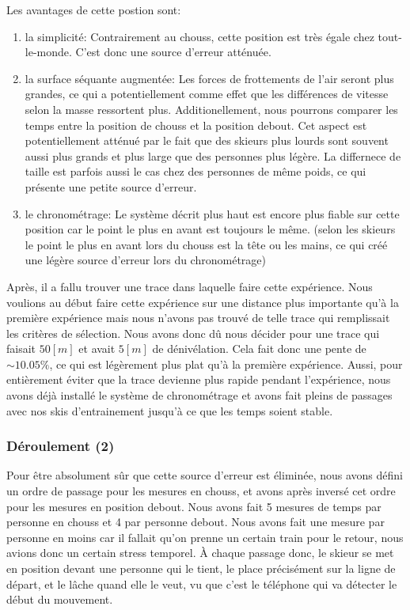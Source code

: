 \documentclass{article}
\begin{document}
Les avantages de cette postion sont:
\begin{enumerate}
    \item la simplicité: Contrairement au chouss, cette position est très égale chez tout-le-monde. C'est donc une source d'erreur atténuée.
    
    \item la surface séquante augmentée: Les forces de frottements de l'air seront plus grandes, ce qui a potentiellement comme effet que les différences de vitesse selon la masse ressortent plus. Additionellement, nous pourrons comparer les temps entre la position de chouss et la position debout. Cet aspect est potentiellement atténué par le fait que des skieurs plus lourds sont souvent aussi plus grands et plus large que des personnes plus légère. La differnece de taille est parfois aussi le cas chez des personnes de même poids, ce qui présente une petite source d'erreur.
    
    \item le chronométrage: Le système décrit plus haut est encore plus fiable sur cette position car le point le plus en avant est toujours le même. (selon les skieurs le point le plus en avant lors du chouss est la tête ou les mains, ce qui créé une légère source d'erreur lors du chronométrage) 
\end{enumerate}

Après, il a fallu trouver une trace dans laquelle faire cette expérience. Nous voulions au début faire cette expérience sur une distance plus importante qu'à la première expérience mais nous n'avons pas trouvé de telle trace qui remplissait les critères de sélection. Nous avons donc dû nous décider pour une trace qui faisait $50[m]$ et avait $5[m]$ de dénivélation. Cela fait donc une pente de $\sim 10.05\%$, ce qui est légèrement plus plat qu'à la première expérience.
\newline Aussi, pour entièrement éviter que la trace devienne plus rapide pendant l'expérience, nous avons déjà installé le système de chronométrage et avons fait pleins de passages avec nos skis d'entrainement jusqu'à ce que les temps soient stable. 

\subsubsection{Déroulement (2)}

Pour être absolument sûr que cette source d'erreur est éliminée, nous avons défini un ordre de passage pour les mesures en chouss, et avons après inversé cet ordre pour les mesures en position debout. Nous avons fait 5 mesures de temps par personne en chouss et 4 par personne debout. Nous avons fait une mesure par personne en moins car il fallait qu'on prenne un certain train pour le retour, nous avions donc un certain stress temporel. 
\newline À chaque passage donc, le skieur se met en position devant une personne qui le tient, le place précisément sur la ligne de départ, et le lâche quand elle le veut, vu que c'est le téléphone qui va détecter le début du mouvement.
\end{document}
